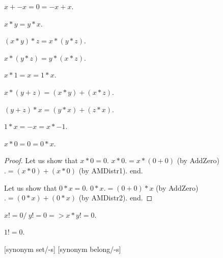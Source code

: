 \documentclass{article}
\begin{document}
\begin{forthel}
    \begin{axiom}[AddInvr]
      $x + -x = 0 = -x + x$.
    \end{axiom}

    \begin{axiom}[MulComm]
      $x * y = y * x$.
    \end{axiom}

    \begin{axiom}[MulAsso]
      $(x * y) * z = x * (y * z)$.
    \end{axiom}

    \begin{axiom}[MulBubble]
      $x * (y * z) = y * (x * z)$.
    \end{axiom}

    \begin{axiom}[MulUnit]
      $x * 1 = x = 1 * x$.
    \end{axiom}

    \begin{axiom}[AMDistr1]
      $x * (y + z) = (x * y) + (x * z)$.
    \end{axiom}

    \begin{axiom}[AMDistr2]
      $(y + z) * x = (y * x) + (z * x)$.
    \end{axiom}

    \begin{axiom}[MulMnOne]
      $1 * x = -x = x * -1$.
    \end{axiom}

    \begin{lemma}[MulZero]
      $x * 0 = 0 = 0 * x$.
    \end{lemma}
    \begin{proof}
      Let us show that $x * 0 = 0$.
        $x * 0 .= x * (0 + 0)$ (by AddZero) $.= (x * 0) + (x * 0)$ (by AMDistr1).
      end.

      Let us show that $0 * x = 0$.
        $0 * x .= (0 + 0) * x$ (by AddZero) $.= (0 * x) + (0 * x)$ (by AMDistr2).
      end.
    \end{proof}

    \begin{axiom}[Cancel]
      $x != 0 /\ y != 0 => x * y != 0$.
    \end{axiom}

    \begin{axiom}[UnNeZr]
      $1 != 0$.
    \end{axiom}

    [synonym set/-s] [synonym belong/-s]


\end{forthel}
\end{document}
